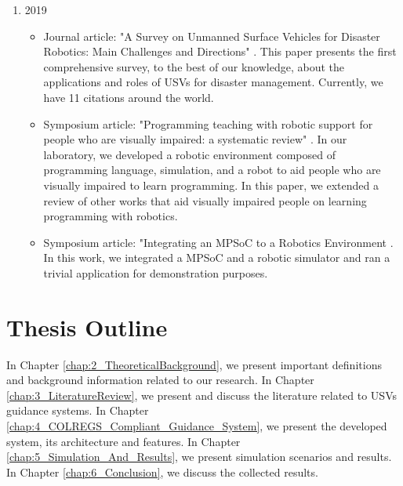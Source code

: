     \begin{enumerate}
        \item 2019
            \begin{itemize}
                \item Journal article: "A Survey on Unmanned Surface Vehicles for Disaster Robotics: Main Challenges and Directions" \cite{Jorge2019Survey}. This paper presents the first comprehensive survey, to the best of our knowledge, about the applications and roles of \acp{USV} for disaster management. Currently, we have 11 citations around the world.
                \item Symposium article: "Programming teaching with robotic support for people who are visually impaired: a systematic review" \cite{Damasio2019Programming}. In our laboratory, we developed a robotic environment composed of programming language, simulation, and a robot to aid people who are visually impaired to learn programming. In this paper, we extended a review of other works that aid visually impaired people on learning programming with robotics.
                \item Symposium article: "Integrating an MPSoC to a Robotics Environment \cite{Domingues2019Integrating}. In this work, we integrated a \ac{MPSoC} and a robotic simulator and ran a trivial application for demonstration purposes.
            \end{itemize}
    \end{enumerate}
    
    \section{Thesis Outline}
    
    In Chapter \ref{chap:2_TheoreticalBackground}, we present important definitions and background information related to our research. In Chapter \ref{chap:3_LiteratureReview}, we present and discuss the literature related to \acp{USV} guidance systems. 
    In Chapter \ref{chap:4_COLREGS_Compliant_Guidance_System}, we present the developed system, its architecture and features. In Chapter \ref{chap:5_Simulation_And_Results}, we present simulation scenarios and results. In Chapter \ref{chap:6_Conclusion}, we discuss the collected results.
    